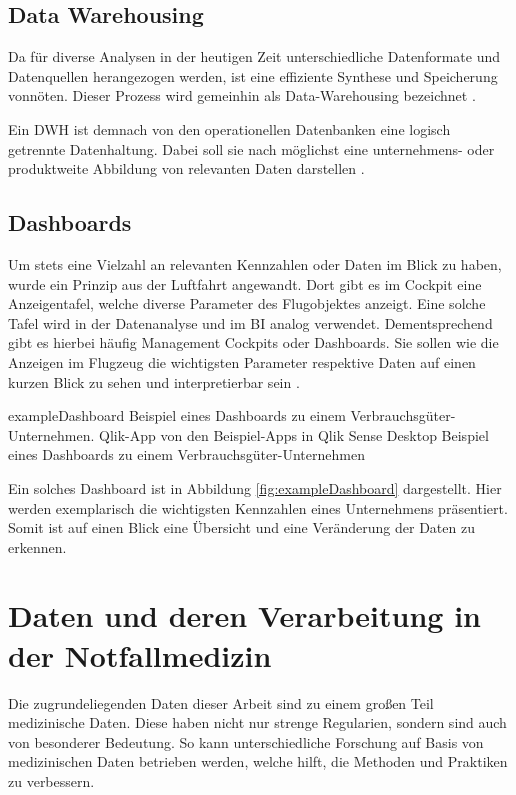\subsection{Data Warehousing}
\label{sub:warehouse}
Da für diverse Analysen in der heutigen Zeit unterschiedliche Datenformate und Datenquellen herangezogen werden, ist eine effiziente Synthese und Speicherung vonnöten.
Dieser Prozess wird gemeinhin als \glqq Data-Warehousing\grqq{} bezeichnet \cite[S.7]{Gabriel.2011}.

Ein \gls{DWH} ist demnach von den operationellen Datenbanken eine logisch getrennte Datenhaltung.
Dabei soll sie nach \cite[S.6]{Mucksch.2000} möglichst eine unternehmens- oder produktweite Abbildung von relevanten Daten darstellen \cite{Kemper.2004}.




\subsection{Dashboards}
\label{sub:dashboards}
Um stets eine Vielzahl an relevanten Kennzahlen oder Daten im Blick zu haben, wurde ein Prinzip aus der Luftfahrt angewandt.
Dort gibt es im Cockpit eine Anzeigentafel, welche diverse Parameter des Flugobjektes anzeigt.
Eine solche Tafel wird in der Datenanalyse und im \gls{BI} analog verwendet.
Dementsprechend gibt es hierbei häufig \glqq Management Cockpits\grqq{} oder \glqq Dashboards\grqq.
Sie sollen wie die Anzeigen im Flugzeug die wichtigsten Parameter respektive Daten auf einen kurzen Blick zu sehen und interpretierbar sein \cite[S.18]{Engels.2015}.

\bildbreit
{exampleDashboard}
{Beispiel eines Dashboards zu einem Verbrauchsgüter-Unternehmen. Qlik-App von den Beispiel-Apps in Qlik Sense Desktop}
{Beispiel eines Dashboards zu einem Verbrauchsgüter-Unternehmen}

Ein solches Dashboard ist in Abbildung \ref{fig:exampleDashboard} dargestellt.
Hier werden exemplarisch die wichtigsten Kennzahlen eines Unternehmens präsentiert.
Somit ist auf einen Blick eine Übersicht und eine Veränderung der Daten zu erkennen.


\section{Daten und deren Verarbeitung in der Notfallmedizin} %
Die zugrundeliegenden Daten dieser Arbeit sind zu einem großen Teil medizinische Daten.
Diese haben nicht nur strenge Regularien, sondern sind auch von besonderer Bedeutung.
So kann unterschiedliche Forschung auf Basis von medizinischen Daten betrieben werden, welche hilft, die Methoden und Praktiken zu verbessern.

